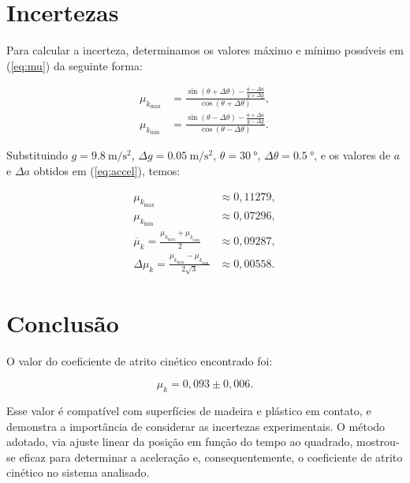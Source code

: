 \documentclass[10pt,oneside,twocolumn,a4paper]{article}
\begin{document}
\section{Incertezas}

Para calcular a incerteza, determinamos os valores máximo e mínimo possíveis em
(\ref{eq:mu}) da seguinte forma:

\begin{align*}
	\mu_{k_\text{max}} &= \frac{\sin(\theta + \Delta\theta) - \frac{a - \Delta a}{g + \Delta g}}{\cos(\theta + \Delta\theta)}, \\
	\mu_{k_\text{min}} &= \frac{\sin(\theta - \Delta\theta) - \frac{a + \Delta a}{g - \Delta g}}{\cos(\theta - \Delta\theta)}.
\end{align*}


Substituindo $g = \SI{9.8}{\meter\per\second\squared}$, $\Delta g =
\SI{0.05}{\meter\per\second\squared}$, $\theta = \SI{30}{\degree}$,
$\Delta\theta = \SI{0.5}{\degree}$, e os valores de $a$ e $\Delta a$ obtidos em
(\ref{eq:accel}), temos:

\begin{align*}
	\mu_{k_\text{max}} &\approx 0,11279, \\
	\mu_{k_\text{min}} &\approx 0,07296, \\
	\overline\mu_k = \frac{\mu_{k_\text{max}} + \mu_{k_\text{min}}}{2} &\approx 0,09287, \\
	\Delta\mu_k = \frac{\mu_{k_\text{max}} - \mu_{k_\text{min}}}{2\sqrt{3}} &\approx 0,00558.
\end{align*}

\section{Conclusão}

O valor do coeficiente de atrito cinético encontrado foi:

\begin{equation*}
	\mu_k = 0,093 \pm 0,006.
\end{equation*}

Esse valor é compatível com superfícies de madeira e plástico em contato, e
demonstra a importância de considerar as incertezas experimentais. O método
adotado, via ajuste linear da posição em função do tempo ao quadrado,
mostrou-se eficaz para determinar a aceleração e, consequentemente, o
coeficiente de atrito cinético no sistema analisado.

\end{document}
